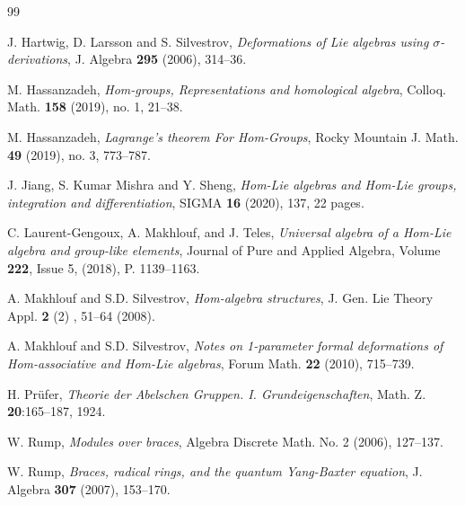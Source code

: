 \documentclass[14pt]{article}
\theoremstyle{Definition}
\theoremstyle{remark}
\begin{document}
\begin{thebibliography}{99}



J. Hartwig, D. Larsson and S. Silvestrov, \emph{Deformations of Lie algebras using $\sigma$-derivations}, J. Algebra \textbf{295} (2006), 314–36.

M. Hassanzadeh, \emph{Hom-groups, Representations and homological algebra}, Colloq. Math. \textbf{158} (2019), no. 1, 21–38.

M. Hassanzadeh, \emph{Lagrange’s theorem For Hom-Groups}, Rocky Mountain J. Math. \textbf{49} (2019), no. 3, 773–787. 

 J. Jiang, S. Kumar Mishra and Y. Sheng, \emph{Hom-Lie algebras and Hom-Lie groups, integration and differentiation}, SIGMA \textbf{16} (2020), 137, 22 pages. 
 
C. Laurent-Gengoux, A. Makhlouf, and J. Teles, \emph{Universal algebra of a Hom-Lie algebra and group-like elements}, Journal of Pure and Applied Algebra, Volume \textbf{222}, Issue 5, (2018), P. 1139–1163.

A. Makhlouf and S.D. Silvestrov, \emph{Hom-algebra structures}, J. Gen. Lie Theory Appl. \textbf{2} (2) , 51–64 (2008).

A. Makhlouf and S.D. Silvestrov, \emph{Notes on 1-parameter formal deformations of Hom-associative and Hom-Lie algebras}, Forum Math. \textbf{22} (2010), 715–739.

H. Pr\"ufer, \emph{Theorie der Abelschen Gruppen. I. Grundeigenschaften}, Math. Z. \textbf{20}:165–187, 1924.

W. Rump, \emph{Modules over braces}, Algebra Discrete Math. No. 2 (2006), 127–137.

W. Rump, \emph{Braces, radical rings, and the quantum Yang-Baxter equation}, J. Algebra \textbf{307} (2007), 153–170.

\end{thebibliography}
 
\end{document}
